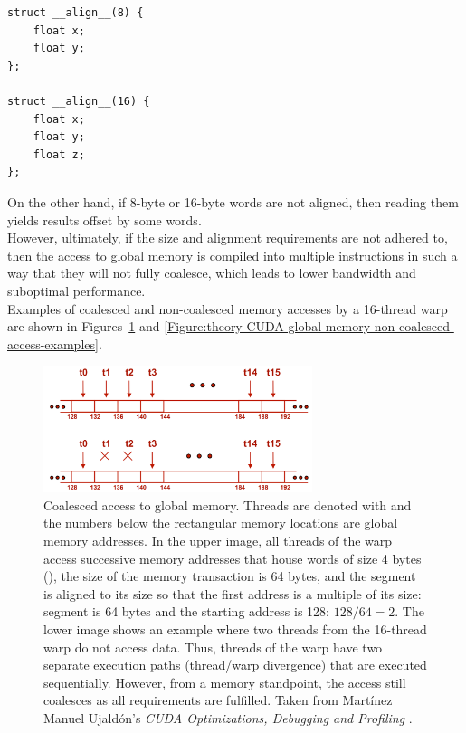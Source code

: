 \begin{lstlisting}[caption={Declaration of to-be-aligned 8- and 16-byte structures. The lower example is aligned to 16 bytes as 12-byte alignment (3 4-byte floats) does not coalesce, therefore, 4 bytes are used for padding. Taken from Nvidia's \emph{CUDA C++ Programming Guide} \cite{NVIDIAMay2022}.},label={Listing:theory-CUDA-aligned-structure-declaration}]
struct __align__(8) {
	float x;
	float y;
};

struct __align__(16) {
	float x;
	float y;
	float z;
};
\end{lstlisting}

On the other hand, if 8-byte or 16-byte words are not aligned, then reading them yields results offset by some words. \\
However, ultimately, if the size and alignment requirements are not adhered to, then the access to global memory is compiled into multiple instructions in such a way that they will not fully coalesce, which leads to lower bandwidth and suboptimal performance. \\
Examples of coalesced and non-coalesced memory accesses by a 16-thread warp are shown in Figures~\ref{Figure:theory-CUDA-global-memory-coalesced-access} and \ref{Figure:theory-CUDA-global-memory-non-coalesced-access-examples}.

\begin{figure}[ht!]
	\centering
	\includegraphics[width=0.7\textwidth, keepaspectratio]{images/ch1/CUDA_global_memory_coalesced_access.png}
	\caption{Coalesced access to global memory. Threads are denoted with  and the numbers below the rectangular memory locations are global memory addresses. In the upper image, all threads of the warp access successive memory addresses that house words of size 4 bytes (), the size of the memory transaction is 64 bytes, and the segment is aligned to its size so that the first address is a multiple of its size: segment is 64 bytes and the starting address is 128: $ 128/64 = 2 $. The lower image shows an example where two threads from the 16-thread warp do not access data. Thus, threads of the warp have two separate execution paths (thread/warp divergence) that are executed sequentially. However, from a memory standpoint, the access still coalesces as all requirements are fulfilled. Taken from Martínez Manuel Ujaldón's \emph{CUDA Optimizations, Debugging and Profiling} \cite{xUOrKLpxlGjvTonr}.}
	\label{Figure:theory-CUDA-global-memory-coalesced-access}
\end{figure}


